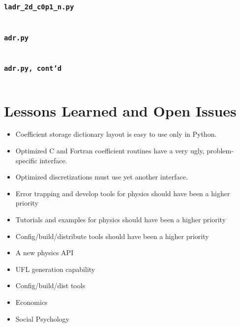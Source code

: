 \documentclass{beamer}
\begin{document}
\begin{frame}
\frametitle{\texttt{ladr\_2d\_c0p1\_n.py}}
\small
%
\inputminted[linenos]{python}{ladr_2d_c0p1_n.py}
\end{frame}

%

\begin{frame}
\frametitle{\texttt{adr.py}}
\small
%
\inputminted[linenos,lastline=12]{python}{adr.py}
\end{frame}

\begin{frame}
\frametitle{\texttt{adr.py, cont'd}}
\small
%
\inputminted[linenos,firstline=13]{python}{adr.py}
\end{frame}

\section{Lessons Learned and Open Issues}

\begin{frame}
\begin{itemize}
\item Coefficient storage dictionary layout is easy to use only in
  Python.
\item Optimized C and Fortran coefficient routines have a very ugly,
  problem-specific interface.
\item Optimized discretizations must use yet another interface.
\end{itemize}
\end{frame}

\begin{frame}
\begin{itemize}
\item Error trapping and develop tools for physics should have been a
  higher priority
\item Tutorials and examples for physics should have been a higher
  priority
\item Config/build/distribute tools should have been a higher priority
\end{itemize}
\end{frame}

\begin{frame}
\begin{itemize}
\item A new physics API
\item UFL generation capability 
\item Config/build/dist tools
\item Economics
\item Social Psychology
\end{itemize}
\end{frame}
\end{document}
